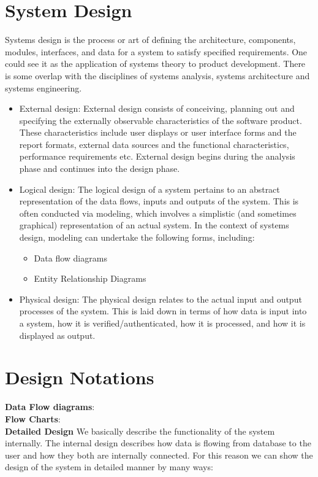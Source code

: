 \section{System Design} Systems design is the process or art of defining 
the architecture, components, modules, interfaces, and data for a 
system to satisfy specified requirements. One could see it as the 
application of systems theory to product development. There is some 
overlap with the disciplines of systems analysis, systems architecture 
and systems engineering.
\begin{itemize}
\item  External design: External design consists of conceiving, 
planning out and specifying the externally observable characteristics 
of the software product. These characteristics include user displays 
or user interface forms and the report formats, external data sources 
and the functional characteristics, performance requirements etc. 
External design begins during the analysis phase
and continues into the design phase.
\item  Logical design: The logical design of a system pertains to an 
abstract representation of the data flows, inputs and outputs of the 
system. This is often conducted via modeling, which involves a 
simplistic (and sometimes graphical) representation of an actual 
system. In the context of systems design, modeling can undertake the 
following forms, including:
\begin{itemize}
\item Data flow diagrams
\item Entity Relationship Diagrams
\end{itemize}
\item  Physical design: The physical design relates to the actual 
input and output processes of the system. This is laid down in terms 
of how data is input into a system, how it is verified/authenticated, 
how it is processed, and how it is displayed as output.
\end{itemize}
\newpage
\section{Design Notations}
{\bf Data Flow diagrams}:
\\
{\bf Flow Charts}:
\\
{\centering \bf Detailed Design}
We basically describe the functionality of the system internally. 
The internal design describes how data is flowing from database to the 
user and how they both are internally connected. For this reason we 
can show the design of the system in detailed manner by many ways: 
